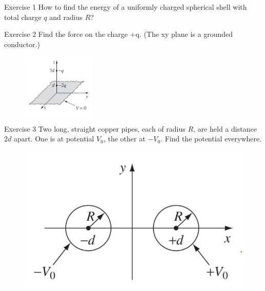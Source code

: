 \documentclass{beamer}
\begin{document}
\begin{frame}{Exercise 1}
    How to find the energy of a uniformly charged spherical shell with total charge $q$ and radius $R$?
\end{frame}

\begin{frame}{Exercise 2}
    Find the force on the charge +q. (The xy plane is a grounded conductor.)
    \vspace{.5em}
    \begin{figure}[H]
        \centering
        \includegraphics[width=3.5cm]{Images/e2.jpg}
    \end{figure}
\end{frame}

\begin{frame}{Exercise 3}
    Two long, straight copper pipes, each of radius $R$, are held a distance $2d$ apart. One is at potential $V_0$, the other at $- V_0$. Find the potential everywhere.
    \begin{figure}[htbp]
        \centering
        \includegraphics{Images/e3.jpg}
    \end{figure}
\end{frame}
\end{document}
